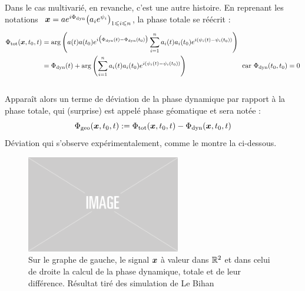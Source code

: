 Dans le cas multivarié, en revanche, c'est une autre histoire. En reprenant les notations $\ \boldsymbol{x} = ae^{i\Phi_{\text{\normalfont dyn}}} \big( a_ie^{\psi_i} \big)_{1\leqslant i\leqslant n}$, la phase totale se réécrit :
\begin{equation}\label{eq:diff_phases_t/d}
	\begin{aligned}
		\Phi_{\text{\normalfont tot}}(\boldsymbol{x},t_0, t) &= \arg \left(a(t)a(t_0) e^{i\big(\Phi_{\text{\normalfont dyn}}(t) - \Phi_{\text{\normalfont dyn}}(t_0)\big)}\sum_{i=1}^n a_i(t)a_i(t_0)e^{i(\psi_i(t)-\psi_i(t_0))} \right) \\
		&= \Phi_{\text{\normalfont dyn}}(t) + \arg \left(\sum_{i=1}^n a_i(t)a_i(t_0)e^{i(\psi_i(t)-\psi_i(t_0))} \right)  \qquad\qquad\qquad\qquad \text{car } \Phi_{\text{\normalfont dyn}}(t_0,t_0) = 0
	\end{aligned}
\end{equation}
\\
Apparaît alors un terme de déviation de la phase dynamique par rapport à la phase totale, qui (surprise) est appelé phase géomatique et sera notée :
\begin{equation}\label{eq:phase_g}
	\Phi_{\text{\normalfont geo}}(\boldsymbol{x},t_0,t) := \Phi_{\text{\normalfont tot}}(\boldsymbol{x}, t_0,t) - \Phi_{\text{\normalfont dyn}}(\boldsymbol{x}, t_0,t)
\end{equation}
Déviation qui s'observe expérimentalement, comme le montre la  ci-dessous.
\\
\begin{figure}[h]
	\includegraphics[width=0.6\textwidth]{fig/placeholder}
	\caption[Déviation de la phase dynamique par rapport à la phase totale]{Sur le graphe de gauche, le signal $\boldsymbol{x}$ à valeur dans $\mathbb{R}^2$ et dans celui de droite la calcul de la phase dynamique, totale et de leur différence. Résultat tiré des simulation de Le Bihan \etal~\cite{le_bihan_modephysiques_2023}}
	\label{fig:calc_diff_phases}
\end{figure}
\\

